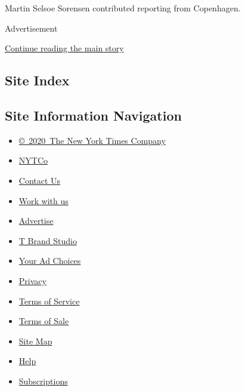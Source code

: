 Martin Selsoe Sorensen contributed reporting from Copenhagen.

Advertisement

\protect\hyperlink{after-bottom}{Continue reading the main story}

\hypertarget{site-index}{%
\subsection{Site Index}\label{site-index}}

\hypertarget{site-information-navigation}{%
\subsection{Site Information
Navigation}\label{site-information-navigation}}

\begin{itemize}
\tightlist
\item
  \href{https://help.nytimes.com/hc/en-us/articles/115014792127-Copyright-notice}{©~2020~The
  New York Times Company}
\end{itemize}

\begin{itemize}
\tightlist
\item
  \href{https://www.nytco.com/}{NYTCo}
\item
  \href{https://help.nytimes.com/hc/en-us/articles/115015385887-Contact-Us}{Contact
  Us}
\item
  \href{https://www.nytco.com/careers/}{Work with us}
\item
  \href{https://nytmediakit.com/}{Advertise}
\item
  \href{http://www.tbrandstudio.com/}{T Brand Studio}
\item
  \href{https://www.nytimes.com/privacy/cookie-policy\#how-do-i-manage-trackers}{Your
  Ad Choices}
\item
  \href{https://www.nytimes.com/privacy}{Privacy}
\item
  \href{https://help.nytimes.com/hc/en-us/articles/115014893428-Terms-of-service}{Terms
  of Service}
\item
  \href{https://help.nytimes.com/hc/en-us/articles/115014893968-Terms-of-sale}{Terms
  of Sale}
\item
  \href{https://spiderbites.nytimes.com}{Site Map}
\item
  \href{https://help.nytimes.com/hc/en-us}{Help}
\item
  \href{https://www.nytimes.com/subscription?campaignId=37WXW}{Subscriptions}
\end{itemize}
